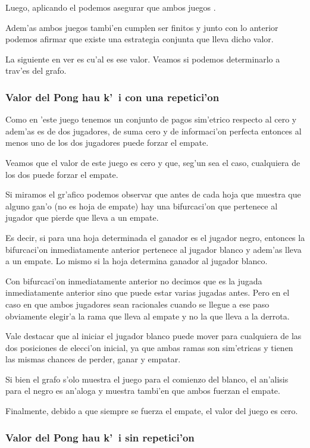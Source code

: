 Luego, aplicando el  podemos asegurar que ambos juegos .

Adem'as ambos juegos tambi'en cumplen ser finitos y junto con lo anterior podemos afirmar que existe una estrategia conjunta que lleva dicho valor.

La siguiente en ver es cu'al es ese valor. Veamos si podemos determinarlo a trav'es del grafo.

\subsubsection{Valor del Pong hau k'\ i con una repetici'on}

Como en 'este juego tenemos un conjunto de pagos sim'etrico respecto al cero y adem'as es de dos jugadores, de suma cero y de informaci'on perfecta entonces al menos uno de los dos jugadores puede forzar el empate.

Veamos que el valor de este juego es cero y que, seg'un sea el caso, cualquiera de los dos puede forzar el empate.

Si miramos el gr'afico podemos observar que antes de cada hoja que muestra que alguno gan'o (no es hoja de empate) hay una bifurcaci'on que pertenece al jugador que pierde que lleva a un empate.

Es decir, si para una hoja determinada el ganador es el jugador negro, entonces la bifurcaci'on inmediatamente anterior pertenece al jugador blanco y adem'as lleva a un empate. Lo mismo si la hoja determina ganador al jugador blanco.

Con bifurcaci'on inmediatamente anterior no decimos que es la jugada inmediatamente anterior sino que puede estar varias jugadas antes. Pero en el caso en que ambos jugadores sean racionales cuando se llegue a ese paso obviamente elegir'a la rama que lleva al empate y no la que lleva a la derrota.

Vale destacar que al iniciar el jugador blanco puede mover para cualquiera de las dos posiciones de elecci'on inicial, ya que ambas ramas son sim'etricas y tienen las mismas chances de perder, ganar y empatar.

Si bien el grafo s'olo muestra el juego para el comienzo del blanco, el an'alisis para el negro es an'aloga y muestra tambi'en que ambos fuerzan el empate.

Finalmente, debido a que siempre se fuerza el empate, el valor del juego es cero.

\subsubsection{Valor del Pong hau k'\ i sin repetici'on}


